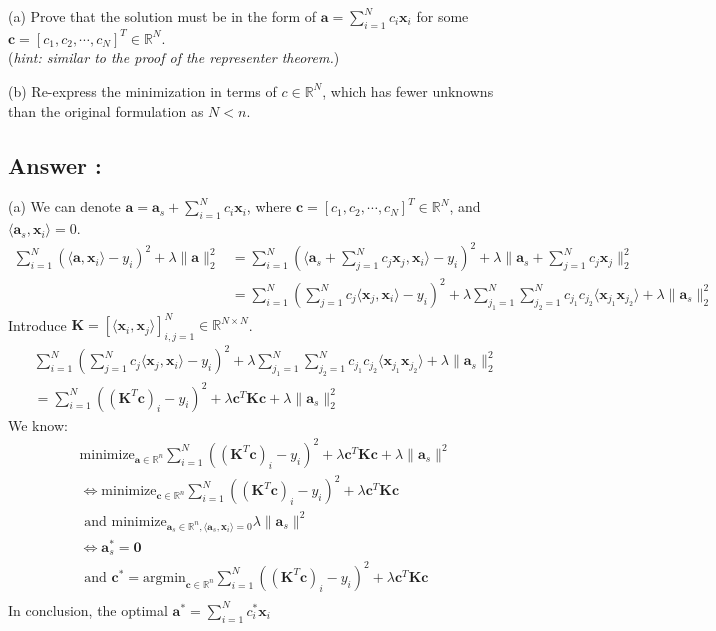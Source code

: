 \documentclass[a4paper,12pt]{article}
\newcommand{\R}{\mathbb{R}}
\begin{document}
(a) Prove that the solution must be in the form of \(\bm{a} = \sum_{i = 1}^N c_i \bm{x}_i\) for some \(\bm{c} = [c_1, c_2, \cdots, c_N]^T \in \R^N\). \\
(\textit{hint: similar to the proof of the representer theorem.})

(b) Re-express the minimization in terms of \(c \in \R^N\), which has fewer unknowns than the original formulation as \(N < n\).


\subsection*{Answer :}
(a) We can denote \(\bm{a} = \bm{a}_s + \sum_{i=1}^N c_i \bm{x}_i\), where \(\bm{c} = [c_1, c_2, \cdots, c_N]^T \in \R^N\), and \(\langle \bm{a}_s, \bm{x}_i\rangle = 0\).
\begin{align*}
    \sum_{i = 1}^N (\langle \bm{a}, \bm{x}_i\rangle - y_i)^2 + \lambda\|\bm{a}\|_2^2 &= \sum_{i = 1}^N (\langle \bm{a}_s + \sum_{j=1}^N c_j \bm{x}_j, \bm{x}_i\rangle - y_i)^2 + \lambda\| \bm{a}_s + \sum_{j=1}^N c_j \bm{x}_j\|_2^2   \\
    &= \sum_{i = 1}^N ( \sum_{j=1}^N c_j \langle \bm{x}_j, \bm{x}_i\rangle - y_i)^2 + \lambda\sum_{j_1=1}^N \sum_{j_2=1}^N c_{j_1}c_{j_2} \langle \bm{x}_{j_1}\bm{x}_{j_2}\rangle + \lambda \|\bm{a}_s\|_2^2
\end{align*}
Introduce \(\bm{K} = [\langle \bm{x}_i, \bm{x}_j \rangle]_{i, j = 1}^N \in \R^{N \times N}\).
\begin{align*}
    &\sum_{i = 1}^N ( \sum_{j=1}^N c_j \langle \bm{x}_j, \bm{x}_i\rangle - y_i)^2 + \lambda\sum_{j_1=1}^N \sum_{j_2=1}^N c_{j_1}c_{j_2} \langle \bm{x}_{j_1}\bm{x}_{j_2}\rangle + \lambda \|\bm{a}_s\|_2^2 \\
    &=\sum_{i = 1}^N ((\bm{K}^T\bm{c})_i - y_i)^2 + \lambda \bm{c}^T \bm{K} \bm{c} + \lambda \|\bm{a}_s\|_2^2  
\end{align*}
We know:
\begin{align*}
    &\text{minimize}_{\bm{a} \in \R^n} \sum_{i = 1}^N ((\bm{K}^T\bm{c})_i - y_i)^2 + \lambda \bm{c}^T \bm{K} \bm{c} + \lambda \|\bm{a}_s\|^2   \\
    &\iff \text{minimize}_{\bm{c} \in \R^n} \sum_{i = 1}^N ((\bm{K}^T\bm{c})_i - y_i)^2 + \lambda \bm{c}^T \bm{K} \bm{c} \\ 
    &\text{ and } \text{minimize}_{\bm{a}_s \in \R^n, \langle \bm{a}_s, \bm{x}_i\rangle = 0} \lambda \|\bm{a}_s\|^2  \\
    &\iff \bm{a}_s^* = \bm{0} \\
    &\text{ and } \bm{c}^* = \text{argmin}_{\bm{c} \in \R^n} \sum_{i = 1}^N ((\bm{K}^T\bm{c})_i - y_i)^2 + \lambda \bm{c}^T \bm{K} \bm{c} \\ 
\end{align*}
In conclusion, the optimal \(\bm{a}^* = \sum_{i = 1}^N c_i^* \bm{x}_i\)
\end{document}

